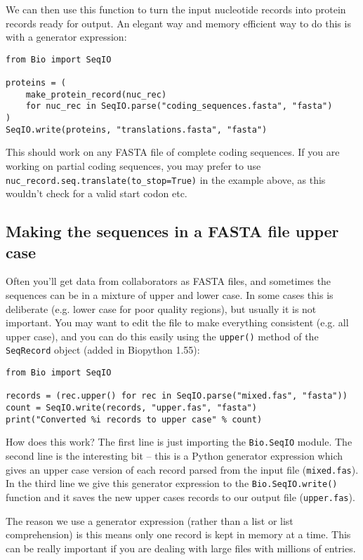 We can then use this function to turn the input nucleotide records into protein
records ready for output.  An elegant way and memory efficient way to do this
is with a generator expression:

\begin{verbatim}
from Bio import SeqIO

proteins = (
    make_protein_record(nuc_rec)
    for nuc_rec in SeqIO.parse("coding_sequences.fasta", "fasta")
)
SeqIO.write(proteins, "translations.fasta", "fasta")
\end{verbatim}

This should work on any FASTA file of complete coding sequences.
If you are working on partial coding sequences, you may prefer to use
\verb|nuc_record.seq.translate(to_stop=True)| in the example above, as
this wouldn't check for a valid start codon etc.

\subsection{Making the sequences in a FASTA file upper case}

Often you'll get data from collaborators as FASTA files, and sometimes the
sequences can be in a mixture of upper and lower case. In some cases this is
deliberate (e.g. lower case for poor quality regions), but usually it is not
important. You may want to edit the file to make everything consistent (e.g.
all upper case), and you can do this easily using the \verb|upper()| method
of the \verb|SeqRecord| object (added in Biopython 1.55):

\begin{verbatim}
from Bio import SeqIO

records = (rec.upper() for rec in SeqIO.parse("mixed.fas", "fasta"))
count = SeqIO.write(records, "upper.fas", "fasta")
print("Converted %i records to upper case" % count)
\end{verbatim}

How does this work? The first line is just importing the \verb|Bio.SeqIO|
module. The second line is the interesting bit -- this is a Python
generator expression which gives an upper case version of each record
parsed from the input file (\texttt{mixed.fas}). In the third line we give
this generator expression to the \verb|Bio.SeqIO.write()| function and it
saves the new upper cases records to our output file (\texttt{upper.fas}).

The reason we use a generator expression (rather than a list or list
comprehension) is this means only one record is kept in memory at a time.
This can be really important if you are dealing with large files with
millions of entries.

